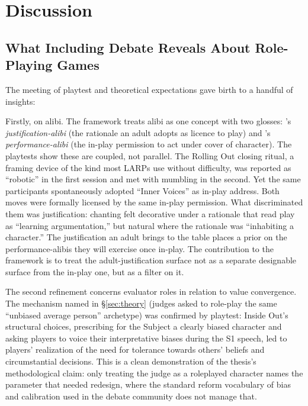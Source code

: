 \section{Discussion}
\label{sec:discussion}

\subsection{What Including Debate Reveals About Role-Playing Games}
\label{sec:rpg-insights}

The meeting of playtest and theoretical expectations gave birth to a handful of insights:

Firstly, on alibi. The framework treats alibi as one concept with two glosses: \textcite{deterding2017alibis}'s \textit{justification-alibi} (the rationale an adult adopts as licence to play) and \textcite{bowman2025transformative}'s \textit{performance-alibi} (the in-play permission to act under cover of character). The playtests show these are coupled, not parallel. The Rolling Out closing ritual, a framing device of the kind most LARPs use without difficulty, was reported as ``robotic'' in the first session and met with mumbling in the second. Yet the same participants spontaneously adopted ``Inner Voices'' as in-play address. Both moves were formally licensed by the same in-play permission. What discriminated them was justification: chanting felt decorative under a rationale that read play as ``learning argumentation,'' but natural where the rationale was ``inhabiting a character.'' The justification an adult brings to the table places a prior on the performance-alibis they will exercise once in-play. The contribution to the framework is to treat the adult-justification surface not as a separate designable surface from the in-play one, but as a filter on it.

The second refinement concerns evaluator roles in relation to value convergence. The mechanism named in §\ref{sec:theory} (judges asked to role-play the same ``unbiased average person'' archetype) was confirmed by playtest: Inside Out's structural choices, prescribing for the Subject a clearly biased character and asking players to voice their interpretative biases during the S1 speech, led to players' realization of the need for tolerance towards others' beliefs and circumstantial decisions. This is a clean demonstration of the thesis's methodological claim: only treating the judge as a roleplayed character names the parameter that needed redesign, where the standard reform vocabulary of bias and calibration used in the debate community does not manage that.

